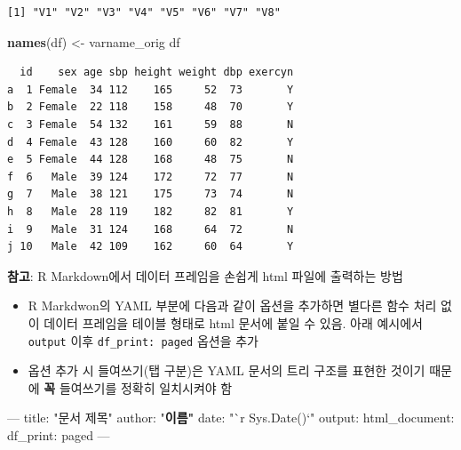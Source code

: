 \documentclass[
  11pt,
]{krantz}
\makeatletter
\newenvironment{Shaded}{\begin{snugshade}}{\end{snugshade}}
\newcommand{\AttributeTok}[1]{\textcolor[rgb]{0.61,0.61,0.61}{#1}}
\newcommand{\ErrorTok}[1]{\textcolor[rgb]{0.14,0.14,0.14}{\textbf{#1}}}
\newcommand{\FunctionTok}[1]{\textcolor[rgb]{0,0,0}{#1}}
\newcommand{\KeywordTok}[1]{\textcolor[rgb]{0.27,0.27,0.27}{\textbf{#1}}}
\newcommand{\NormalTok}[1]{#1}
\newcommand{\OtherTok}[1]{\textcolor[rgb]{0.37,0.37,0.37}{#1}}
\newcommand{\StringTok}[1]{\textcolor[rgb]{0.5,0.5,0.5}{#1}}
\providecommand{\tightlist}{%
  \setlength{\itemsep}{0pt}\setlength{\parskip}{0pt}}
\newenvironment{kframe}{%
\medskip{}
\setlength{\fboxsep}{.8em}
 \def\at@end@of@kframe{}%
 \ifinner\ifhmode%
  \def\at@end@of@kframe{\end{minipage}}%
  \begin{minipage}{\columnwidth}%
 \fi\fi%
 \def\FrameCommand##1{\hskip\@totalleftmargin \hskip-\fboxsep
 \colorbox{shadecolor}{##1}\hskip-\fboxsep
     \hskip-\linewidth \hskip-\@totalleftmargin \hskip\columnwidth}%
 \MakeFramed {\advance\hsize-\width
   \@totalleftmargin\z@ \linewidth\hsize
   \@setminipage}}%
 {\par\unskip\endMakeFramed%
 \at@end@of@kframe}
\newenvironment{rmdblock}[1]
  {
  \begin{itemize}
  \renewcommand{\labelitemi}{
    \raisebox{-.7\height}[0pt][0pt]{
      {\setkeys{Gin}{width=3em,keepaspectratio}\texttt{[image: images/\#1]}}
    }
  }
  \setlength{\fboxsep}{1em}
  \begin{kframe}
  \item
  }
  {
  \end{kframe}
  \end{itemize}
  }
\newenvironment{rmdtip}
  {\begin{rmdblock}{tip}}
  {\end{rmdblock}}
\makeatother
\begin{document}
\begin{verbatim}
[1] "V1" "V2" "V3" "V4" "V5" "V6" "V7" "V8"
\end{verbatim}

\begin{Shaded}
\begin{Highlighting}[]
\KeywordTok{names}\NormalTok{(df) <-}\StringTok{ }\NormalTok{varname_orig}
\NormalTok{df}
\end{Highlighting}
\end{Shaded}

\begin{verbatim}
  id    sex age sbp height weight dbp exercyn
a  1 Female  34 112    165     52  73       Y
b  2 Female  22 118    158     48  70       Y
c  3 Female  54 132    161     59  88       N
d  4 Female  43 128    160     60  82       Y
e  5 Female  44 128    168     48  75       N
f  6   Male  39 124    172     72  77       N
g  7   Male  38 121    175     73  74       N
h  8   Male  28 119    182     82  81       Y
i  9   Male  31 124    168     64  72       N
j 10   Male  42 109    162     60  64       Y
\end{verbatim}

\normalsize

\footnotesize

\begin{rmdtip}
\begin{rmdtip}

\textbf{참고}: R Markdown에서 데이터 프레임을 손쉽게 html 파일에 출력하는 방법

\begin{itemize}
\tightlist
\item
  R Markdwon의 YAML 부분에 다음과 같이 옵션을 추가하면 별다른 함수 처리 없이 데이터 프레임을 테이블 형태로 html 문서에 붙일 수 있음. 아래 예시에서 \texttt{output} 이후 \texttt{df\_print:\ paged} 옵션을 추가
\item
  옵션 추가 시 들여쓰기(탭 구분)은 YAML 문서의 트리 구조를 표현한 것이기 때문에 \textbf{꼭} 들여쓰기를 정확히 일치시켜야 함
\end{itemize}

\end{rmdtip}
\end{rmdtip}

\normalsize

\footnotesize

\begin{Shaded}
\begin{Highlighting}[]
\OtherTok{---}
\FunctionTok{title:}\AttributeTok{ }\StringTok{"문서 제목"}
\StringTok{author: "}\ErrorTok{이름"}
\FunctionTok{date:}\AttributeTok{ }\StringTok{"`r Sys.Date()`"}
\FunctionTok{output:}\AttributeTok{ }
  \FunctionTok{html_document:}\AttributeTok{ }
    \FunctionTok{df_print:}\AttributeTok{ paged}
\OtherTok{---}
\end{Highlighting}
\end{Shaded}
\end{document}
